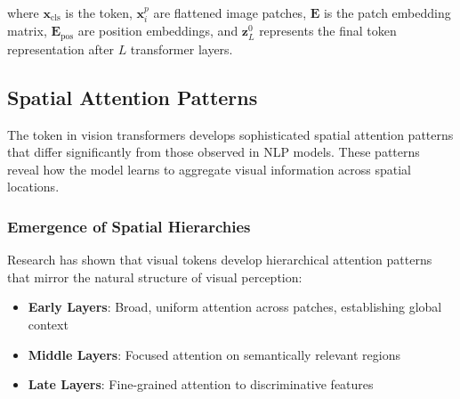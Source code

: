 where $\mathbf{x}_{\text{cls}}$ is the \cls{} token, $\mathbf{x}_i^p$ are flattened image patches, $\mathbf{E}$ is the patch embedding matrix, $\mathbf{E}_{\text{pos}}$ are position embeddings, and $\mathbf{z}_L^0$ represents the final \cls{} token representation after $L$ transformer layers.

\subsection{Spatial Attention Patterns}

The \cls{} token in vision transformers develops sophisticated spatial attention patterns that differ significantly from those observed in NLP models. These patterns reveal how the model learns to aggregate visual information across spatial locations.

\subsubsection{Emergence of Spatial Hierarchies}

Research has shown that visual \cls{} tokens develop hierarchical attention patterns that mirror the natural structure of visual perception:

\begin{itemize}
\item \textbf{Early Layers}: Broad, uniform attention across patches, establishing global context
\item \textbf{Middle Layers}: Focused attention on semantically relevant regions
\item \textbf{Late Layers}: Fine-grained attention to discriminative features
\end{itemize}

